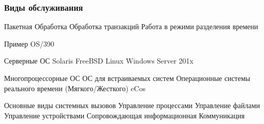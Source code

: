 \documentclass[a4paper]{article}
\begin{document}
\subsubsection{Виды обслуживания}
Пакетная Обработка
Обработка транзакций
Работа в режими разделения времени

Пример OS/390

Серверные ОС
Solaris
FreeBSD
Linux
Windows Server 201x

Многопроцессорные ОС
ОС для встраиваемых систем
Операционные системы реального времени (Мягкого/Жесткого) eCos


Основные виды системных вызовов
Управление процессами
Управление файлами
Управление устройствами
Сопровождающая информационная
Коммуникация
\end{document}
